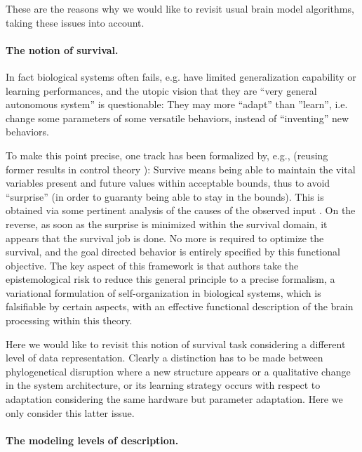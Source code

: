 \documentclass[a4,12pt]{article}
\begin{document}
These are the reasons why we would like to revisit usual brain model algorithms, taking these issues into account.

\paragraph{The notion of survival.}

In fact biological systems often fails, e.g. have limited generalization capability or learning performances, and the utopic vision that they are ``very general autonomous system'' is questionable: They may more ``adapt'' than ''learn'', i.e. change some parameters of some versatile behaviors, instead of ``inventing'' new behaviors.

To make this point precise, one track has been formalized by, e.g., \cite{friston2016active2} (reusing former results in control theory \cite{haddad1981monotone}): Survive means being able to maintain the vital variables present and future values within acceptable bounds, thus to avoid ``surprise'' (in order to guaranty being able to stay in the bounds). This is obtained via some pertinent analysis of the causes of the observed input \cite{schwartenbeck2013exploration}. On the reverse, as soon as the surprise is minimized within the survival domain, it appears that the survival job is done. No more is required to optimize the survival, and the goal directed behavior is entirely specified by this functional objective. The key aspect of this framework is that authors take the epistemological risk to reduce this general principle to a precise formalism, a variational formulation of self-organization in biological systems, which is falsifiable \cite{popper2005logic} by certain aspects, with an effective functional description of the brain processing within this theory.

Here we would like to revisit this notion of survival task considering a different level of data representation. Clearly a distinction has to be made between phylogenetical disruption where a new structure appears or a qualitative change in the system architecture, or its learning strategy occurs with respect to adaptation considering the same hardware but parameter adaptation. Here we only consider this latter issue.

\paragraph{The modeling levels of description.}
\end{document}
